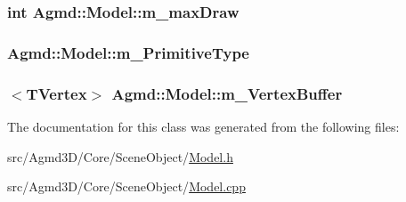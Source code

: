 \hypertarget{class_agmd_1_1_model_aa701193843b8e5a474af2ed70ed799c2}{
\subsubsection[{m\+\_\+max\+Draw}]{\setlength{\rightskip}{0pt plus 5cm}int Agmd\+::\+Model\+::m\+\_\+max\+Draw\hspace{0.3cm}{\ttfamily [protected]}}}\label{class_agmd_1_1_model_aa701193843b8e5a474af2ed70ed799c2}
\hypertarget{class_agmd_1_1_model_ab1c4d49d1ceb1b6805818c0f551cefe5}{
\subsubsection[{m\+\_\+\+Primitive\+Type}]{ Agmd\+::\+Model\+::m\+\_\+\+Primitive\+Type\hspace{0.3cm}{\ttfamily [protected]}}}\label{class_agmd_1_1_model_ab1c4d49d1ceb1b6805818c0f551cefe5}
\hypertarget{class_agmd_1_1_model_a3ca80a337e1c867da9ba233ab63edac4}{
\subsubsection[{m\+\_\+\+Vertex\+Buffer}]{$<${\bf T\+Vertex}$>$ Agmd\+::\+Model\+::m\+\_\+\+Vertex\+Buffer\hspace{0.3cm}{\ttfamily [protected]}}}\label{class_agmd_1_1_model_a3ca80a337e1c867da9ba233ab63edac4}


The documentation for this class was generated from the following files\+:\begin{DoxyCompactItemize}
\item 
src/\+Agmd3\+D/\+Core/\+Scene\+Object/\hyperlink{_model_8h}{Model.\+h}\item 
src/\+Agmd3\+D/\+Core/\+Scene\+Object/\hyperlink{_model_8cpp}{Model.\+cpp}\end{DoxyCompactItemize}

